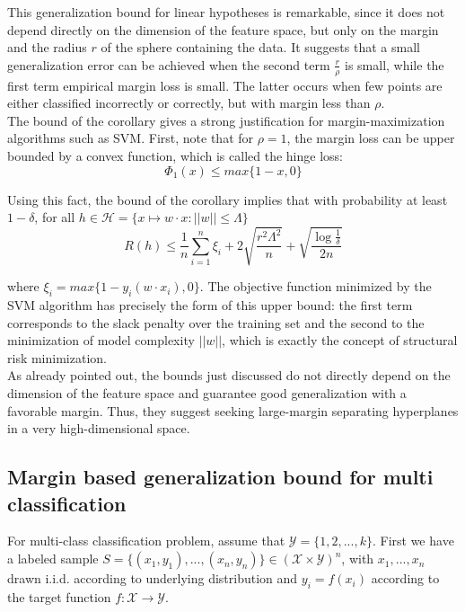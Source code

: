 This generalization bound for linear hypotheses is remarkable, since it does
not depend directly on the dimension of the feature space, but only on the margin and the radius $r$ of the sphere containing the data.
It suggests that a small generalization error can be achieved when the second term $\frac{r}{\rho}$ is small, while the first term empirical margin loss is small. The
latter occurs when few points are either classified incorrectly or correctly, but with
margin less than $\rho$.\\

The bound of the corollary gives a strong justification for margin-maximization
algorithms such as SVM. First, note that for $\rho = 1$, the margin loss can be upper
bounded by a convex function, which is called the hinge loss:
\begin{equation}
\Phi_1(x) \leq max\{1-x,0\}
\end{equation}

Using this fact, the bound of the corollary implies that with probability at least
$1-\delta$, for all $h\in \mathcal{H} = \{x \mapsto w \cdot x : ||w||\leq \Lambda \}$
\begin{equation}
R(h) \leq \frac{1}{n}\sum_{i=1}^{n}\xi_i + 2\sqrt{\frac{r^2\Lambda^2}{n}} + \sqrt{\frac{\log\frac{1}{\delta}}{2n}}
\end{equation}

where $\xi_i = max\{1-y_i(w\cdot x_i), 0\}$. The objective function minimized by the SVM
algorithm has precisely the form of this upper bound: the first term corresponds to
the slack penalty over the training set and the second to the minimization of model complexity $||w||$, which is exactly the concept of structural risk minimization. \\

As already pointed out, the bounds just discussed do not directly depend on the
dimension of the feature space and guarantee good generalization with a favorable
margin. Thus, they suggest seeking large-margin separating hyperplanes in a very
high-dimensional space. 


\subsection{Margin based generalization bound for multi classification}
For multi-class classification problem, assume that $\mathcal{Y}=\{1,2,...,k\}$. First we have a labeled sample $S=\{(x_1,y_1),...,(x_n,y_n)\} \in (\mathcal{X}\times \mathcal{Y})^n$, with $x_1,...,x_n$ drawn i.i.d. according to underlying distribution and $y_i = f(x_i)$ according to the target function $f : \mathcal{X} \to \mathcal{Y}$.

